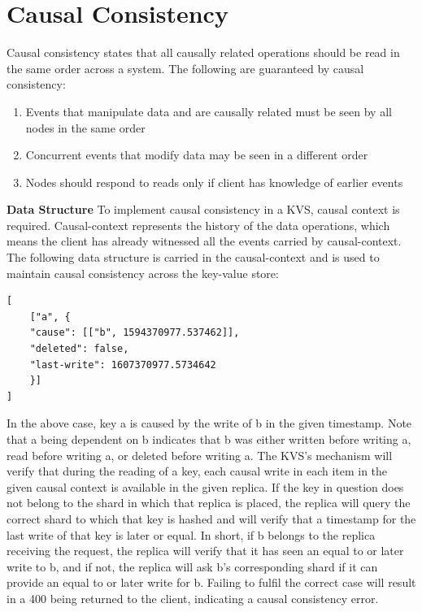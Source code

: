 \documentclass[12pt]{article}
\begin{document}
\section{Causal Consistency}
Causal consistency states that all causally related operations should be read in the same order across a system. The following are guaranteed by causal consistency:
\begin{enumerate}
	\item Events that manipulate data and are causally related must be seen by all nodes in the same order
	\item Concurrent events that modify data may be seen in a different order
	\item Nodes should respond to reads only if client has knowledge of earlier events

\end{enumerate}
\textbf{Data Structure}
\newline
To implement causal consistency in a KVS, causal context is required. Causal-context represents the history of the data operations, which means the client has already witnessed all the events carried by causal-context. The following data structure is carried in the causal-context and is used to maintain causal consistency across the key-value store: 
\begin{verbatim}
[
    ["a", {
    "cause": [["b", 1594370977.537462]],
    "deleted": false,
    "last-write": 1607370977.5734642
    }]
]
\end{verbatim}

In the above case, key a is caused by the write of b in the given timestamp. Note that a being dependent on b indicates that b was either written before writing a, read before writing a, or deleted before writing a. The KVS's mechanism will verify that during the reading of a key, each causal write in each item in the given causal context is available in the given replica. If the key in question does not belong to the shard in which that replica is placed, the replica will query the correct shard to which that key is hashed and will verify that a timestamp for the last write of that key is later or equal. In short, if b belongs to the replica receiving the request, the replica will verify that it has seen an equal to or later write to b, and if not, the replica will ask b's corresponding shard if it can provide an equal to or later write for b. Failing to fulfil the correct case will result in a 400 being returned to the client, indicating a causal consistency error.
\end{document}
